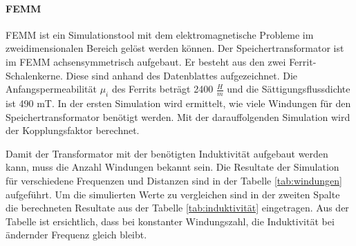 \paragraph{FEMM}
FEMM ist ein Simulationstool mit dem elektromagnetische Probleme im zweidimensionalen Bereich gelöst werden können. Der Speichertransformator ist im FEMM achsensymmetrisch aufgebaut. Er besteht aus den zwei Ferrit-Schalenkerne. Diese sind anhand des Datenblattes aufgezeichnet. Die Anfangspermeabilität $ \mu_{i} $ des Ferrits beträgt 2400 $ \frac{H}{m} $ und die Sättigungsflussdichte ist 490 mT. In der ersten Simulation wird ermittelt, wie viele Windungen für den Speichertransformator benötigt werden. Mit der darauffolgenden Simulation wird der Kopplungsfaktor berechnet. 

Damit der Transformator mit der benötigten Induktivität aufgebaut werden kann, muss die Anzahl Windungen bekannt sein. Die Resultate der Simulation für verschiedene Frequenzen und Distanzen sind in der Tabelle \ref{tab:windungen} aufgeführt. Um die simulierten Werte zu vergleichen sind in der zweiten Spalte die berechneten Resultate aus der Tabelle \ref{tab:induktivität} eingetragen. Aus der Tabelle ist ersichtlich, dass bei konstanter Windungszahl, die Induktivität bei ändernder Frequenz gleich bleibt.

